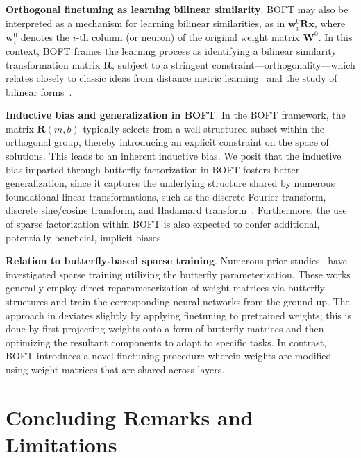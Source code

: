 \textbf{Orthogonal finetuning as learning bilinear similarity}. BOFT may also be interpreted as a mechanism for learning bilinear similarities, as in $\bm{w}^0_i\bm{R}\bm{x}$, where $\bm{w}^0_i$ denotes the $i$-th column (or neuron) of the original weight matrix $\bm{W}^0$. In this context, BOFT frames the learning process as identifying a bilinear similarity transformation matrix $\bm{R}$, subject to a stringent constraint—orthogonality—which relates closely to classic ideas from distance metric learning~\cite{xing2002distance} and the study of bilinear forms~\cite{roman2005advanced}.

\textbf{Inductive bias and generalization in BOFT}. In the BOFT framework, the matrix $\bm{R}(m,b)$ typically selects from a well-structured subset within the orthogonal group, thereby introducing an explicit constraint on the space of solutions. This leads to an inherent inductive bias. We posit that the inductive bias imparted through butterfly factorization in BOFT fosters better generalization, since it captures the underlying structure shared by numerous foundational linear transformations, such as the discrete Fourier transform, discrete sine/cosine transform, and Hadamard transform~\cite{dao2019kaleidoscope}. Furthermore, the use of sparse factorization within BOFT is also expected to confer additional, potentially beneficial, implicit biases~\cite{gunasekar2017implicit,li2018algorithmic,liu2019neural}.

\textbf{Relation to butterfly-based sparse training}. Numerous prior studies~\cite{dao2019learning,dao2019kaleidoscope,chen2022pixelated,dao2022monarch} have investigated sparse training utilizing the butterfly parameterization. These works generally employ direct reparameterization of weight matrices via butterfly structures and train the corresponding neural networks from the ground up. The approach in \cite{dao2022monarch} deviates slightly by applying finetuning to pretrained weights; this is done by first projecting weights onto a form of butterfly matrices and then optimizing the resultant components to adapt to specific tasks. In contrast, BOFT introduces a novel finetuning procedure wherein weights are modified using weight matrices that are shared across layers.



\section{Concluding Remarks and Limitations}

